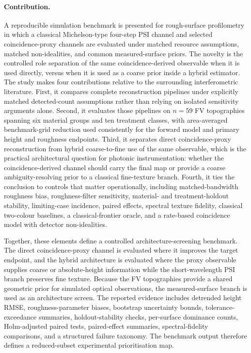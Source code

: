 \documentclass[photonics,article,submit,pdftex,moreauthors]{Definitions/mdpi}
\begin{document}
\paragraph{Contribution.}
A reproducible simulation benchmark is presented for rough-surface profilometry in which a classical Michelson-type four-step PSI channel and selected coincidence-proxy channels are evaluated under matched resource assumptions, matched non-idealities, and common measured-surface priors. The novelty is the controlled role separation of the same coincidence-derived observable when it is used directly, versus when it is used as a coarse prior inside a hybrid estimator. The study makes four contributions relative to the surrounding interferometric literature. First, it compares complete reconstruction pipelines under explicitly matched detected-count assumptions rather than relying on isolated sensitivity arguments alone. Second, it evaluates those pipelines on $n=59$ FV topographies spanning six material groups and ten treatment classes, with area-averaged benchmark-grid reduction used consistently for the forward model and primary height and roughness endpoints. Third, it separates direct coincidence-proxy reconstruction from hybrid coarse-to-fine use of the same observable, which is the practical architectural question for photonic instrumentation: whether the coincidence-derived channel should carry the final map or provide a coarse ambiguity-resolving prior to a classical fine-texture branch. Fourth, it ties the conclusion to controls that matter operationally, including matched-bandwidth roughness bias, roughness-filter sensitivity, material- and treatment-holdout stability, limiting-case incidence, paired effects, spectral texture fidelity, classical two-colour baselines, a classical-frontier oracle, and a rate-based coincidence model with detector non-idealities.

Together, these elements define a controlled architecture-screening benchmark. The direct coincidence-proxy channel is evaluated where it improves the target endpoint, and the hybrid architecture is evaluated where the proxy observable supplies coarse or absolute-height information while the short-wavelength PSI branch preserves fine texture. Because the FV topographies provide a shared geometric prior for simulated optical observations, the measured-surface branch is used as an architecture screen. The reported evidence includes detrended height RMSE, roughness-parameter biases, bootstrap uncertainty bounds, tolerance-exceedance summaries, holdout-stability checks, per-surface dominance counts, Holm-adjusted paired tests, paired-effect summaries, spectral-fidelity comparisons, and a structured failure taxonomy. The benchmark output therefore defines a reduced-subset experimental prioritisation map.
\end{document}
